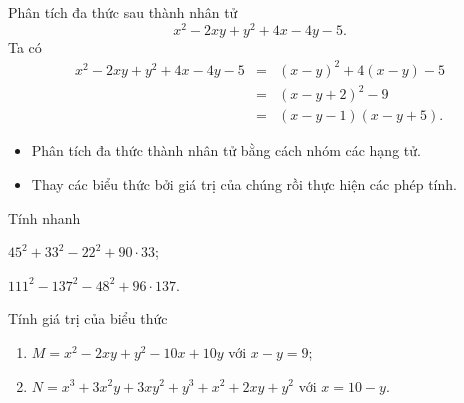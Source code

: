 \begin{vd}
Phân tích đa thức sau thành nhân tử 
\[x^2-2xy+y^2+4x-4y-5.\]
	\loigiai
	{
		Ta có
	{\allowdisplaybreaks \begin{eqnarray*}
		x^2-2xy+y^2+4x-4y-5&=&\left(x-y\right)^2+4(x-y)-5\\
		&=&\left(x-y+2\right)^2-9\\
		&=&(x-y-1)(x-y+5).
	\end{eqnarray*}}	
	}
\end{vd}


\begin{dang}
\begin{itemize}
\item Phân tích đa thức thành nhân tử bằng cách nhóm các hạng tử.
\item Thay các biểu thức bởi giá trị của chúng rồi thực hiện các phép tính.
\end{itemize}
\end{dang}

\begin{vd}
Tính nhanh
\begin{listEX}[2]
\item $45^2+33^2-22^2+90\cdot 33$;
\item $111^2-137^2-48^2+96\cdot 137$.
\end{listEX}
\end{vd}

\begin{vd}
Tính giá trị của biểu thức
\begin{enumerate}
\item $M=x^2-2xy+y^2-10x+10y$ với $x-y=9$;
\item $N=x^3+3x^2y+3xy^2+y^3+x^2+2xy+y^2$ với $x=10-y$.
\end{enumerate}
\end{vd}



